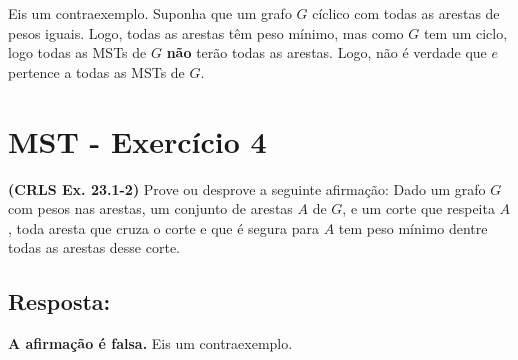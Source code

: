 \documentclass{article}
\begin{document}
Eis um contraexemplo. Suponha que um grafo $G$ cíclico com todas as arestas de pesos iguais. Logo, todas as arestas têm peso mínimo, mas como $G$ tem um ciclo, logo todas as MSTs de $G$ \textbf{não} terão todas as arestas. Logo, não é verdade que $e$ pertence a todas as MSTs de $G$.

\newpage

\section*{MST - Exercício 4}
\textbf{(CRLS Ex. 23.1-2)} Prove ou desprove a seguinte afirmação: Dado um grafo $G$ com pesos nas arestas, um conjunto de arestas $A$ de $G$, e um corte que respeita $A$, toda aresta que cruza o corte e que é segura para $A$ tem peso mínimo dentre todas as arestas desse corte.

\subsection*{Resposta:}
\textbf{A afirmação é falsa.} Eis um contraexemplo.

\end{document}
